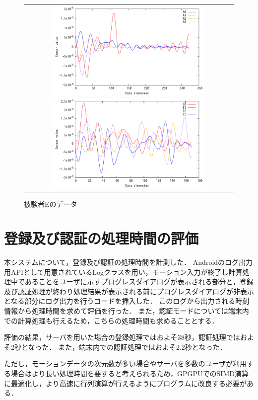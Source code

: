 \begin{figure}[bthp]
  \centering
  \begin{tabular}{c}
    \begin{minipage}{.48\hsize}
      \centering
      \includegraphics[bb=0 0 360 216, width=8cm]{Graphs/comp_A.pdf}
      \caption{被験者Aのデータ}
      \label{comp-a}
    \end{minipage}
    \begin{minipage}{.48\hsize}
      \centering
      \includegraphics[bb=0 0 360 216, width=8cm]{Graphs/comp_E.pdf}
      \caption{被験者Eのデータ}
      \label{comp-e}
    \end{minipage}
  \end{tabular}
\end{figure}

\section{登録及び認証の処理時間の評価}
本システムについて，登録及び認証の処理時間を計測した．
Androidのログ出力用APIとして用意されているLogクラス\cite{5-log}を用い，モーション入力が終了し計算処理中であることをユーザに示すプログレスダイアログが表示される部分と，登録及び認証処理が終わり処理結果が表示される前にプログレスダイアログが非表示となる部分にログ出力を行うコードを挿入した．
このログから出力される時刻情報から処理時間を求めて評価を行った．
また，認証モードについては端末内での計算処理も行えるため，こちらの処理時間も求めることとする．

評価の結果，サーバを用いた場合の登録処理ではおよそ38秒，認証処理ではおよそ2秒となった．
また，端末内での認証処理ではおよそ2.2秒となった．

ただし，モーションデータの次元数が多い場合やサーバを多数のユーザが利用する場合はより長い処理時間を要すると考えられるため，GPGPUでのSIMD演算に最適化し，より高速に行列演算が行えるようにプログラムに改良する必要がある．
